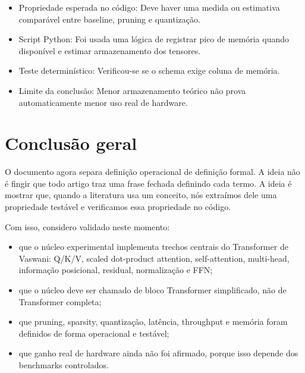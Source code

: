\begin{itemize}
\item Propriedade esperada no código:
Deve haver uma medida ou estimativa comparável entre baseline, pruning e
quantização.
\end{itemize}

\begin{itemize}
\item Script Python:
Foi usada uma lógica de registrar pico de memória quando disponível e estimar
armazenamento dos tensores.
\end{itemize}

\begin{itemize}
\item Teste determinístico:
Verificou-se se o schema exige coluna de memória.
\end{itemize}

\begin{itemize}
\item Limite da conclusão:
Menor armazenamento teórico não prova automaticamente menor uso real de
hardware.
\end{itemize}



\section{Conclusão geral}






O documento agora separa definição operacional de definição formal. A ideia não é fingir que todo artigo traz uma frase fechada definindo cada termo. A ideia é mostrar que, quando a literatura usa um conceito, nós extraímos dele uma propriedade testável e verificamos essa propriedade no código.



Com isso, considero validado neste momento:

\begin{itemize}
\item que o núcleo experimental implementa trechos centrais do Transformer de
Vaswani: Q/K/V, scaled dot-product attention, self-attention, multi-head,
informação posicional, residual, normalização e FFN;
\item que o núcleo deve ser chamado de bloco Transformer simplificado, não de
Transformer completa;
\item que pruning, sparsity, quantização, latência, throughput e memória foram
definidos de forma operacional e testável;
\item que ganho real de hardware ainda não foi afirmado, porque isso depende dos
benchmarks controlados.
\end{itemize}
